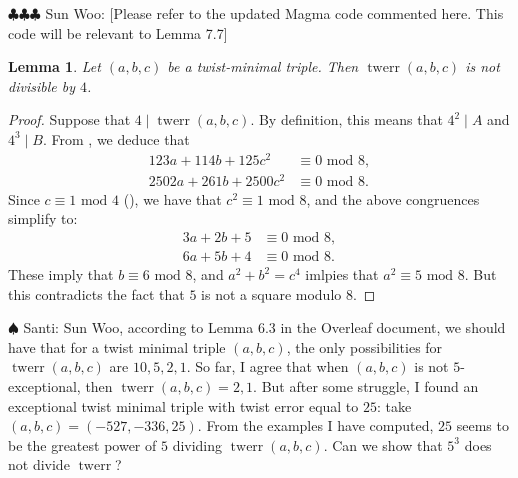 \documentclass[12pt]{amsart}
\newcounter{counter}[section] %
\numberwithin{equation}{section} %
\newtheorem{lemma}[counter]{Lemma}
\theoremstyle{definition} \newtheorem{definition}[counter]{Definition}
\theoremstyle{remark} \newtheorem{nonexam}[counter]{Non-example}
\newcommand{\md}{\text{ mod }} %
\newcommand{\santi}[1]{{\color{cyan} \sf
    $\spadesuit$ Santi: #1}}
\newcommand{\spark}[1]{{\color{olive} \sf
    $\clubsuit\clubsuit\clubsuit$ Sun Woo: [#1]}}
\DeclareMathOperator{\twerr}{twerr} %
\begin{document}

\spark{Please refer to the updated Magma code commented here. This code will be relevant to Lemma 7.7}


\begin{lemma}
  \label{lemma:4-nmid-twerr}
  Let $(a,b,c)$ be a twist-minimal triple. Then
  $\twerr(a,b,c)$ is not divisible by $4$.
\end{lemma}
\begin{proof}
  Suppose that $4 \mid \twerr(a,b,c)$. By definition, this means that $4^2 \mid
  A$ and $4^3 \mid B$. From , we deduce that
  \begin{align*}
    123a + 114b + 125c^2 &\equiv 0 \md 8, \\
    2502a + 261b + 2500c^2 &\equiv 0 \md 8.
  \end{align*}
  Since $c \equiv 1 \md 4$ (), we have that
  $c^2 \equiv 1 \md 8$, and the above congruences simplify to:
    \begin{align*}
    3a + 2b + 5 &\equiv 0 \md 8, \\
    6a + 5b + 4 &\equiv 0 \md 8.
    \end{align*}
    These imply that $b \equiv 6 \md 8$, and $a^2 + b^2 = c^4$ imlpies that
    $a^2 \equiv 5 \md 8$. But this contradicts the fact that $5$ is not a
    square modulo $8$.
  \end{proof}

  \santi{Sun Woo, according to Lemma 6.3 in the Overleaf document, we should
    have that for a twist minimal triple $(a,b,c)$, the only possibilities for
    $\twerr(a,b,c)$ are $10, 5, 2, 1$. So far, I agree that when $(a,b,c)$ is
    not $5$-exceptional, then $\twerr(a,b,c) = 2, 1$. But after some struggle,
    I found an exceptional twist minimal triple with twist error equal to $25$:
    take $(a,b,c) = (-527, -336, 25)$. From the examples I have computed, $25$
    seems to be the greatest power of $5$ dividing $\twerr(a,b,c)$. Can we show
    that $5^3$ does not divide $\twerr$?}
\end{document}
